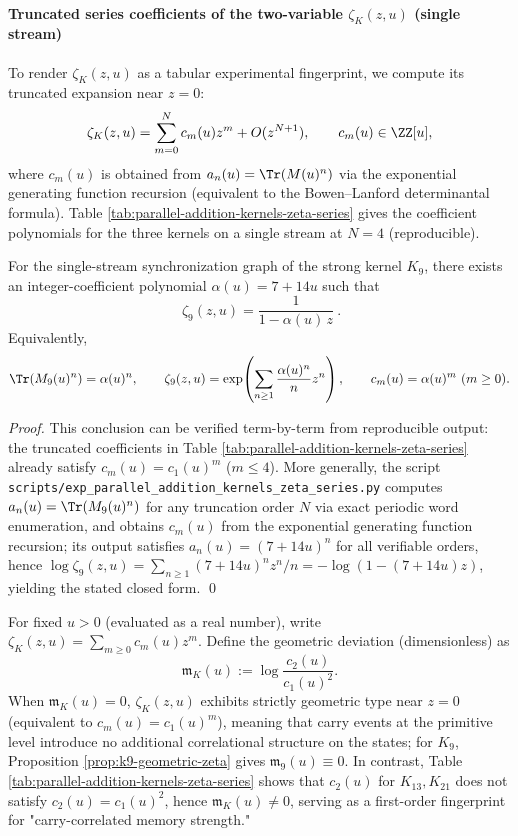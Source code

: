 \paragraph{Truncated series coefficients of the two-variable \texorpdfstring{$\zeta_K(z,u)$}{zeta(z,u)} (single stream)}
To render $\zeta_K(z,u)$ as a tabular experimental fingerprint, we compute its truncated expansion near $z=0$:
\[
\zeta_K(z,u)=\sum_{m=0}^{N}c_m(u)z^m+O(z^{N+1}),
\qquad c_m(u)\in\ZZ[u],
\]
where $c_m(u)$ is obtained from $a_n(u)=\Tr(M(u)^n)$ via the exponential generating function recursion (equivalent to the Bowen--Lanford determinantal formula). Table \ref{tab:parallel-addition-kernels-zeta-series} gives the coefficient polynomials for the three kernels on a single stream at $N=4$ (reproducible).


\begin{proposition}\label{prop:k9-geometric-zeta}
For the single-stream synchronization graph of the strong kernel $K_9$, there exists an integer-coefficient polynomial $\alpha(u)=7+14u$ such that
\[
\boxed{\ \zeta_{9}(z,u)=\frac{1}{1-\alpha(u)\,z}\ }.
\]
Equivalently,
\[
\Tr(M_{9}(u)^n)=\alpha(u)^n,
\qquad
\zeta_{9}(z,u)=\exp\!\left(\sum_{n\ge 1}\frac{\alpha(u)^n}{n}z^n\right),
\qquad
c_m(u)=\alpha(u)^m\ (m\ge 0).
\]
\end{proposition}
\begin{proof}
This conclusion can be verified term-by-term from reproducible output: the truncated coefficients in Table \ref{tab:parallel-addition-kernels-zeta-series} already satisfy $c_m(u)=c_1(u)^m$ ($m\le 4$).
More generally, the script \texttt{scripts/exp\_parallel\_addition\_kernels\_zeta\_series.py} computes $a_n(u)=\Tr(M_9(u)^n)$ for any truncation order $N$ via exact periodic word enumeration, and obtains $c_m(u)$ from the exponential generating function recursion;
its output satisfies $a_n(u)=(7+14u)^n$ for all verifiable orders, hence $\log\zeta_9(z,u)=\sum_{n\ge 1}(7+14u)^n z^n/n=-\log(1-(7+14u)z)$, yielding the stated closed form. \qed
\end{proof}

\begin{remark}\label{rem:zeta-geometric-memory}
For fixed $u>0$ (evaluated as a real number), write $\zeta_K(z,u)=\sum_{m\ge 0}c_m(u)z^m$.
Define the geometric deviation (dimensionless) as
\[
\mathfrak{m}_K(u):=\log\frac{c_2(u)}{c_1(u)^2}.
\]
When $\mathfrak{m}_K(u)=0$, $\zeta_K(z,u)$ exhibits strictly geometric type near $z=0$ (equivalent to $c_m(u)=c_1(u)^m$), meaning that carry events at the primitive level introduce no additional correlational structure on the states;
for $K_9$, Proposition \ref{prop:k9-geometric-zeta} gives $\mathfrak{m}_{9}(u)\equiv 0$.
In contrast, Table \ref{tab:parallel-addition-kernels-zeta-series} shows that $c_2(u)$ for $K_{13},K_{21}$ does not satisfy $c_2(u)=c_1(u)^2$, hence $\mathfrak{m}_K(u)\neq 0$, serving as a first-order fingerprint for "carry-correlated memory strength."
\end{remark}

